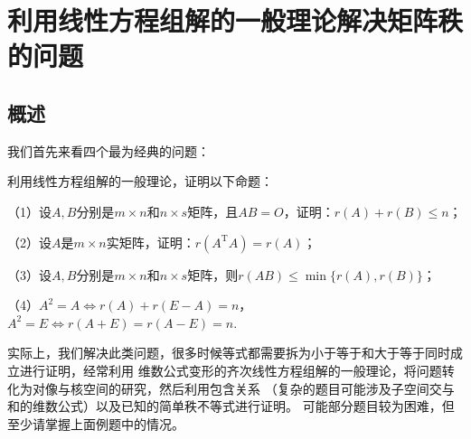 \section{利用线性方程组解的一般理论解决矩阵秩的问题}
\subsection{概述}
我们首先来看四个最为经典的问题：
\begin{example}
	利用线性方程组解的一般理论，证明以下命题：
	
	\textup{（1）}设$A,B$分别是$m \times n$和$n \times s$矩阵，且$AB=O$，证明：$r(A)+r(B)\le n$\textup{；}

	\textup{（2）}设$A$是$m \times n$实矩阵，证明：$r(A^\mathrm{T}A)=r(A)$\textup{；}

	\textup{（3）}设$A,B$分别是$m \times n$和$n \times s$矩阵，则$r(AB)\le\min\{r(A),r(B)\}$\textup{；}

	\textup{（4）}$A^2=A \iff r(A)+r(E-A)=n$，$A^2=E \iff r(A+E)=r(A-E)=n$.
\end{example}
实际上，我们解决此类问题，很多时候等式都需要拆为小于等于和大于等于同时成立进行证明，经常利用
维数公式变形的齐次线性方程组解的一般理论，将问题转化为对像与核空间的研究，然后利用包含关系
（复杂的题目可能涉及子空间交与和的维数公式）以及已知的简单秩不等式进行证明。
可能部分题目较为困难，但至少请掌握上面例题中的情况。
